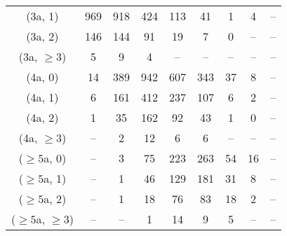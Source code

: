 \begin{table}[h!]
{\begin{tabular}{ccccccccc}
	(3a, 1) & 969 & 918 & 424 & 113 & 41 & 1 & 4 & -- \\[0.5ex] 
	(3a, 2) & 146 & 144 & 91 & 19 & 7 & 0 & -- & -- \\[0.5ex] 
	(3a, $\ge3$) & 5 & 9 & 4 & -- & -- & -- & -- & -- \\[0.5ex] 
	(4a, 0) & 14 & 389 & 942 & 607 & 343 & 37 & 8 & -- \\[0.5ex] 
	(4a, 1) & 6 & 161 & 412 & 237 & 107 & 6 & 2 & -- \\[0.5ex] 
	(4a, 2) & 1 & 35 & 162 & 92 & 43 & 1 & 0 & -- \\[0.5ex] 
	(4a, $\ge3$) & -- & 2 & 12 & 6 & 6 & -- & -- & -- \\[0.5ex] 
	($\ge5$a, 0) & -- & 3 & 75 & 223 & 263 & 54 & 16 & -- \\[0.5ex] 
	($\ge5$a, 1) & -- & 1 & 46 & 129 & 181 & 31 & 8 & -- \\[0.5ex] 
	($\ge5$a, 2) & -- & 1 & 18 & 76 & 83 & 18 & 2 & -- \\[0.5ex] 
	($\ge5$a, $\ge3$) & -- & -- & 1 & 14 & 9 & 5 & -- & -- \\[0.5ex] 
	\hline
	\hline
\end{tabular}}
\end{table}
